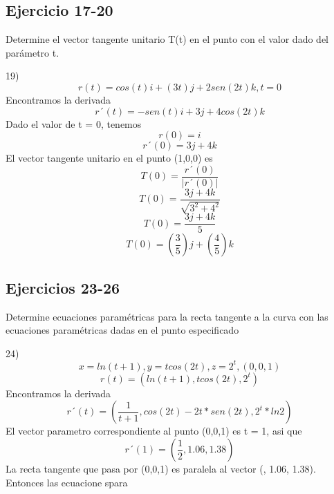 \subsection{Ejercicio 17-20}
\item Determine el vector tangente unitario T(t) en el punto con
el valor dado del parámetro t.
\item 19)
\begin{equation}
    r(t) = cos(t)i + (3t)j + 2sen(2t)k, t = 0
\end{equation}
Encontramos la derivada
\begin{equation}
    r´(t) = -sen(t)i + 3j + 4cos(2t)k
\end{equation}
Dado el valor de t = 0, tenemos
\begin{equation}
    r(0) = i
\end{equation}
\begin{equation}
    r´(0) = 3j + 4k
\end{equation}
El vector tangente unitario en el punto (1,0,0) es
\begin{equation}
    T(0) = \frac{r´(0)}{|r´(0)|}
\end{equation}
\begin{equation}
    T(0) = \frac{3j + 4k}{\sqrt{3^2 + 4^2}}
\end{equation}
\begin{equation}
    T(0) = \frac{3j + 4k}{5}
\end{equation}
\begin{equation}
    T(0) = (\frac{3}{5})j + (\frac{4}{5})k
\end{equation}

\subsection{Ejercicios 23-26}
\item Determine ecuaciones paramétricas para la recta tangente
a la curva con las ecuaciones paramétricas dadas en el punto
especificado
\item 24)
\begin{equation}
    x = ln(t + 1), y = tcos(2t), z = 2^t, (0,0,1)
\end{equation}
\begin{equation}
    r(t) = (ln(t + 1), tcos(2t), 2^t)
\end{equation}
Encontramos la derivada
\begin{equation}
    r´(t) = (\frac{1}{t + 1}, cos(2t) - 2t*sen(2t), 2^t*ln2)
\end{equation}
El vector parametro correspondiente al punto (0,0,1) es t = 1, asi que
\begin{equation}
    r´(1) = (\frac{1}{2}, 1.06, 1.38)
\end{equation}
La recta tangente que pasa por (0,0,1) es paralela al vector (, 1.06, 1.38). Entonces las ecuacione spara

